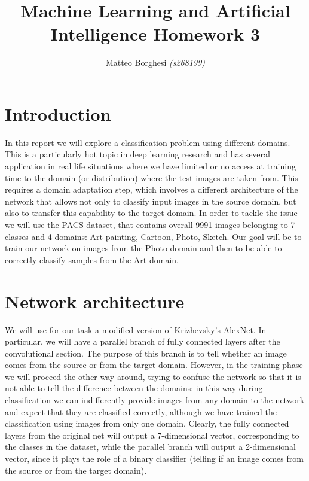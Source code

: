 \documentclass[11pt,twoside,a4paper]{article}
\begin{document}
\title{Machine Learning and Artificial Intelligence Homework 3}
\author{Matteo Borghesi \textit{(s268199)}}
\maketitle

\section{Introduction}
In this report we will explore a classification problem using different domains. This is a particularly hot topic in deep learning research and has several application in real life situations where we have limited or no access at training time to the domain (or distribution) where the test images are taken from. This requires a domain adaptation step, which involves a different architecture of the network that allows not only to classify input images in the source domain, but also to transfer this capability to the target domain.\newline
In order to tackle the issue we will use the PACS dataset, that contains overall 9991 images belonging to 7 classes and 4 domains: Art painting, Cartoon, Photo, Sketch. Our goal will be to train our network on images from the Photo domain and then to be able to correctly classify samples from the Art domain.

\section{Network architecture}
\label{arch}
We will use for our task a modified version of Krizhevsky's AlexNet. In particular, we will have a parallel branch of fully connected layers after the convolutional section. The purpose of this branch is to tell whether an image comes from the source or from the target domain. However, in the training phase we will proceed the other way around, trying to confuse the network so that it is not able to tell the difference between the domains: in this way during classification we can indifferently provide images from any domain to the network and expect that they are classified correctly, although we have trained the classification using images from only one domain.\newline
Clearly, the fully connected layers from the original net will output a 7-dimensional vector, corresponding to the classes in the dataset, while the parallel branch will output a 2-dimensional vector, since it plays the role of a binary classifier (telling if an image comes from the source or from the target domain).
\end{document}

